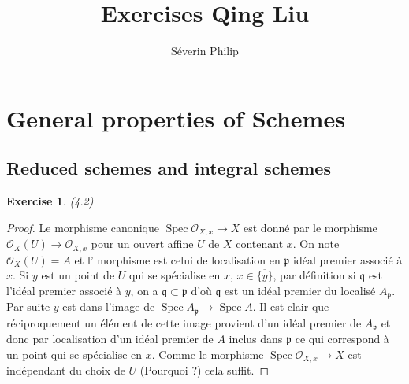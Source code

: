 \documentclass[A4, 11pt]{article}
\author{Séverin Philip}
\newtheorem{exer}{Exercise}
\def\Spec{ \operatorname{Spec}}
\begin{document}
\title{Exercises Qing Liu}
\maketitle

\section{General properties of Schemes}
\subsection{Reduced schemes and integral schemes}
\begin{exer} (4.2)
\end{exer}
\begin{proof}
Le morphisme canonique $\Spec \mathcal{O}_{X,x} \rightarrow X$ est donné par le morphisme 
$\mathcal{O}_{X}(U) \rightarrow \mathcal{O}_{X,x}$ pour un ouvert affine $U$ de $X$ contenant $x$. On note $\mathcal{O}_{X}(U)=A$ et l' morphisme est celui de localisation en $\mathfrak{p}$ idéal premier associé à $x$. Si $y$ est un point de $U$ qui se spécialise en $x$, $x\in \overline{\{y\}}$, par définition si $\mathfrak{q}$ est l'idéal premier associé à $y$, on a $\mathfrak{q} \subset \mathfrak{p}$ d'où $\mathfrak{q}$ est un idéal premier du localisé $A_{\mathfrak{p}}$. Par suite $y$ est dans l'image de $\Spec A_{\mathfrak{p}} \rightarrow \Spec A$. Il est clair que réciproquement un élément de cette image provient d'un idéal premier de $A_{\mathfrak{p}}$ et donc par localisation d'un idéal premier de $A$ inclus dans $\mathfrak{p}$ ce qui correspond à un point qui se spécialise en $x$. Comme le morphisme $\Spec \mathcal{O}_{X,x} \rightarrow X$ est indépendant du choix de $U$ (Pourquoi ?) cela suffit.
\end{proof}
\end{document}
